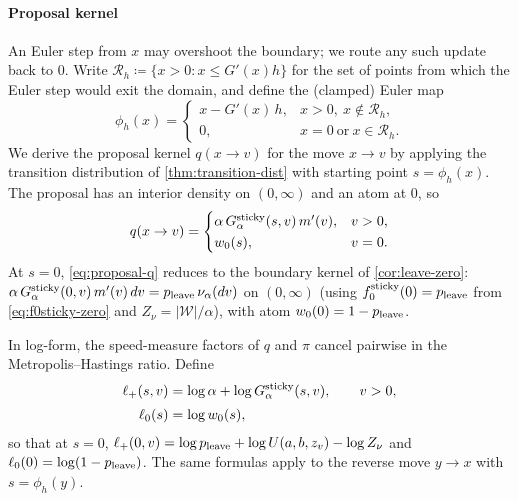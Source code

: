 \documentclass[aap,preprint]{imsart}
\numberwithin{equation}{section}
\theoremstyle{plain}
\theoremstyle{definition}
\begin{document}
\paragraph{Proposal kernel} An Euler step from $x$ may overshoot the boundary; we route any such update back to $0$. Write $\mathcal R_h \coloneqq \{x>0 : x \le G'(x)h\}$ for the set of points from which the Euler step would exit the domain, and define the (clamped) Euler map
\[
  \phi_h(x) = \begin{cases}
    x - G'(x)\,h, & x > 0,\ x\notin\mathcal{R}_h,\\
    0,            & x = 0\ \text{or}\ x\in\mathcal{R}_h.
  \end{cases}
\]
We derive the proposal kernel $q(x\to v)$ for the move $x\to v$ by applying the transition distribution of \cref{thm:transition-dist} with starting point $s = \phi_h(x)$.
The proposal  has an interior density on $(0,\infty)$
and an atom at $0$, so
\begin{equation}\label{eq:proposal-q}
  q(x\to v)
  = \begin{cases}
    \alpha\,G_\alpha^{\rm sticky}(s,v)\,m'(v), & v > 0,\\[1pt]
    w_0(s),                                    & v = 0.
  \end{cases}
\end{equation}
At $s = 0$, \cref{eq:proposal-q} reduces to the boundary kernel of \cref{cor:leave-zero}: $\alpha\,G^{\rm sticky}_\alpha(0,v)\,m'(v)\,dv = p_{\rm leave}\,\nu_\alpha(dv)$ on $(0,\infty)$ (using $f_0^{\rm sticky}(0) = p_{\rm leave}$ from \cref{eq:f0sticky-zero} and $Z_\nu = |\mathcal{W}|/\alpha$), with atom $w_0(0) = 1 - p_{\rm leave}$.

In log-form, the speed-measure factors of $q$ and $\pi$ cancel pairwise in the Metropolis--Hastings ratio. Define
\begin{align*}
  \ell_+(s,v) &= \log\alpha + \log G^{\rm sticky}_\alpha(s,v), \qquad v > 0,\\[2pt]
  \ell_0(s)   &= \log w_0(s),
\end{align*}
so that at $s = 0$, $\ell_+(0,v) = \log p_{\rm leave} + \log U(a,b,z_v) - \log Z_\nu$ and $\ell_0(0) = \log(1 - p_{\rm leave})$. The same formulas apply to the reverse move $y\to x$ with $s = \phi_h(y)$. 
\end{document}
